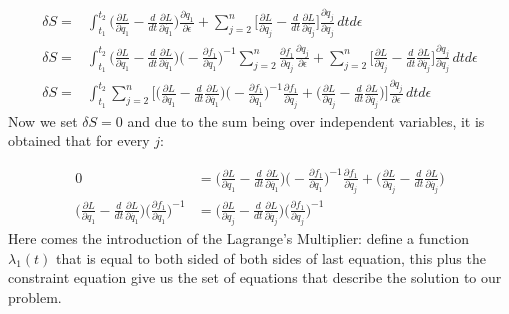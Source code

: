 \documentclass{article}
\begin{document}
\begin{equation*}
    \begin{split}
        \delta S =& \int_{t_1}^{t_2} \bigg(\frac{\partial L}{\partial {q_1}} -\frac{d}{dt}\frac{\partial L}{\partial \dot{q_1}} \bigg) \frac{\partial q_1}{\partial \epsilon} + \sum_{j=2}^{n} \bigg[\frac{\partial L}{\partial {q_j}} -\frac{d}{dt}\frac{\partial L}{\partial \dot{q_j}}\bigg]\frac{\partial q_j}{\partial q_j}  \,dtd\epsilon\\
        \delta S =& \int_{t_1}^{t_2} \bigg(\frac{\partial L}{\partial {q_1}} -\frac{d}{dt}\frac{\partial L}{\partial \dot{q_1}} \bigg) \bigg(-\frac{\partial f_1}{\partial q_1}  \bigg)^{-1}  \sum_{j=2}^{n} \frac{\partial f_1}{\partial q_j} \frac{\partial q_j}{\partial\epsilon} + \sum_{j=2}^{n} \bigg[\frac{\partial L}{\partial {q_j}} -\frac{d}{dt}\frac{\partial L}{\partial \dot{q_j}}\bigg]\frac{\partial q_j}{\partial q_j}  \,dtd\epsilon\\
        \delta S =& \int_{t_1}^{t_2} \sum_{j=2}^{n} \bigg[ \bigg(\frac{\partial L}{\partial {q_1}} -\frac{d}{dt}\frac{\partial L}{\partial \dot{q_1}} \bigg) \bigg(-\frac{\partial f_1}{\partial q_1}  \bigg)^{-1}\frac{\partial f_1}{\partial q_j} + \bigg( \frac{\partial L}{\partial {q_j}} -\frac{d}{dt}\frac{\partial L}{\partial \dot{q_j}}   \bigg)\bigg] \frac{\partial q_j}{\partial \epsilon} \,dtd\epsilon
  \end{split}
\end{equation*}
Now we set $\delta S=0$ and due to the sum being over independent variables, it is obtained that for every $j$:

\begin{equation*}
    \begin{split}
        0&=\bigg(\frac{\partial L}{\partial {q_1}} -\frac{d}{dt}\frac{\partial L}{\partial \dot{q_1}} \bigg) \bigg(-\frac{\partial f_1}{\partial q_1}  \bigg)^{-1}\frac{\partial f_1}{\partial q_j} + \bigg( \frac{\partial L}{\partial {q_j}} -\frac{d}{dt}\frac{\partial L}{\partial \dot{q_j}}   \bigg)\\
        \bigg(\frac{\partial L}{\partial {q_1}} -\frac{d}{dt}\frac{\partial L}{\partial \dot{q_1}} \bigg) \bigg(\frac{\partial f_1}{\partial q_1}  \bigg)^{-1} &= \bigg( \frac{\partial L}{\partial {q_j}} -\frac{d}{dt}\frac{\partial L}{\partial \dot{q_j}} \bigg)\bigg(\frac{\partial f_1}{\partial q_j}  \bigg)^{-1}
    \end{split}
\end{equation*}
Here comes the introduction of the Lagrange's Multiplier: define a function $\lambda_1(t)$ that is equal to both sided of both sides of last equation, this plus the constraint equation give us the set of equations that describe the solution to our problem.
\end{document}
